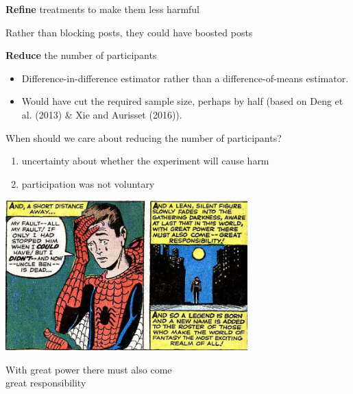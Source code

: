 \documentclass[aspectratio=169]{beamer}
\begin{document}
\begin{frame}

\begin{framed}
\textbf{Refine} treatments to make them less harmful
\end{framed}

\pause
Rather than blocking posts, they could have boosted posts

\end{frame}
\begin{frame}

\begin{framed}
\textbf{Reduce} the number of participants
\end{framed}

\begin{itemize}
\item Difference-in-difference estimator rather than a difference-of-means estimator.  
\item Would have cut the required sample size, perhaps by half (based on Deng et al. (2013) \& Xie and Aurisset (2016)).
\end{itemize}

\end{frame}
\begin{frame}

When should we care about reducing the number of participants?
\pause
\begin{enumerate}
\item uncertainty about whether the experiment will cause harm
\item participation was not voluntary
\end{enumerate}

\end{frame}
\begin{frame}

\begin{center}
\includegraphics[width=0.7\textwidth]{figures/spiderman_great_power}
\end{center}

\pause

\LARGE{
\begin{center}
With great power there must also come\\great responsibility
\end{center}
}

\end{frame}
\end{document}
